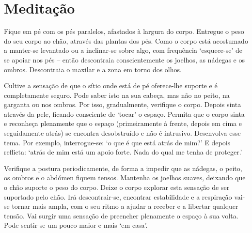 
\chapter{Meditação}


Fique em pé com os pés paralelos, afastados à largura do corpo. Entregue o peso do seu corpo ao chão, através das plantas dos pés. Como o corpo está acostumado a manter-se levantado ou a inclinar-se sobre algo, com frequência `esquece-se' de se apoiar nos pés -- então descontraia conscientemente os joelhos, as nádegas e os ombros. Descontraia o maxilar e a zona em torno dos olhos.

Cultive a sensação de que o sítio onde está de pé oferece-lhe suporte e é completamente seguro. Pode saber isto na sua cabeça, mas não no peito, na garganta ou nos ombros. Por isso, gradualmente, verifique o corpo. Depois sinta através da pele, ficando consciente de `tocar' o espaço. Permita que o corpo sinta e reconheça plenamente que o espaço (primeiramente à frente, depois em cima e seguidamente atrás) se encontra desobstruído e não é intrusivo. Desenvolva esse tema. Por exemplo, interrogue-se: `o que é que está atrás de mim?' E depois reflicta: `atrás de mim está um apoio forte. Nada do qual me tenha de proteger.'

Verifique a postura periodicamente, de forma a impedir que as nádegas, o peito, os ombros e o abdómen fiquem tensos. Mantenha os joelhos suaves, deixando que o chão suporte o peso do corpo. Deixe o corpo explorar esta sensação de ser suportado pelo chão. Irá descontrair-se, encontrar estabilidade e a respiração vai-se tornar mais ampla, com o seu ritmo a ajudar a receber e a libertar qualquer tensão. Vai surgir uma sensação de preencher plenamente o espaço à sua volta. Pode sentir-se um pouco maior e mais `em casa'.


